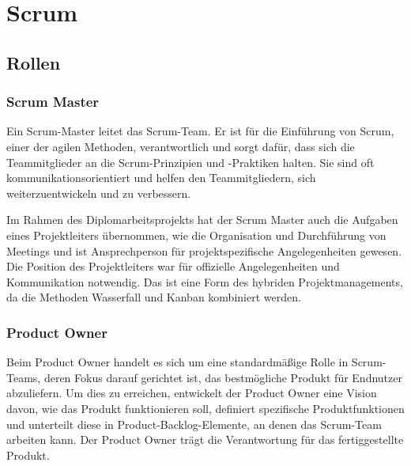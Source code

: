 
\section{Scrum}\label{sec:scrum}

\renewcommand{\kapitelautor}{Autor: Nils Hubmann} %

\subsection{Rollen}\label{subsec:rollen}

%
\subsubsection{Scrum Master}\label{subsubsec:Scrum-Master}
%

\begin{coolQuote}
Ein Scrum-Master leitet das Scrum-Team.
Er ist für die Einführung von Scrum, einer der agilen Methoden, verantwortlich und sorgt dafür, dass sich die Teammitglieder an die Scrum-Prinzipien und -Praktiken halten.
Sie sind oft kommunikationsorientiert und helfen den Teammitgliedern, sich weiterzuentwickeln und zu verbessern.
\end{coolQuote}

Im Rahmen des Diplomarbeitsprojekts hat der Scrum Master auch die Aufgaben eines Projektleiters übernommen, wie die Organisation und Durchführung von Meetings und ist Ansprechperson für projektspezifische Angelegenheiten gewesen.
Die Position des Projektleiters war für offizielle Angelegenheiten und Kommunikation notwendig.
Das ist eine Form des hybriden Projektmanagements, da die Methoden Wasserfall und Kanban kombiniert werden.

%
\subsubsection{Product Owner}\label{subsubsec:Product-Owner}
%

\begin{coolQuote}
Beim Product Owner handelt es sich um eine standardmäßige Rolle in Scrum-Teams, deren Fokus darauf gerichtet ist, das bestmögliche Produkt für Endnutzer abzuliefern.
Um dies zu erreichen, entwickelt der Product Owner eine Vision davon, wie das Produkt funktionieren soll, definiert spezifische Produktfunktionen und unterteilt diese in Product-Backlog-Elemente, an denen das Scrum-Team arbeiten kann.
Der Product Owner trägt die Verantwortung für das fertiggestellte Produkt.
\end{coolQuote}


